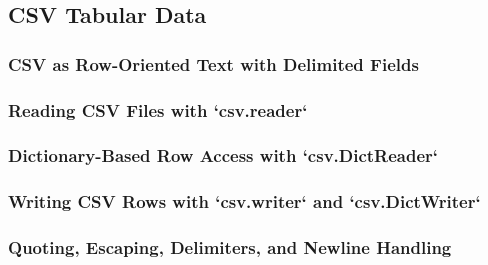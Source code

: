 \subsection{CSV Tabular Data}
\subsubsection{CSV as Row-Oriented Text with Delimited Fields}
\subsubsection{Reading CSV Files with `csv.reader`}
\subsubsection{Dictionary-Based Row Access with `csv.DictReader`}
\subsubsection{Writing CSV Rows with `csv.writer` and `csv.DictWriter`}
\subsubsection{Quoting, Escaping, Delimiters, and Newline Handling}
